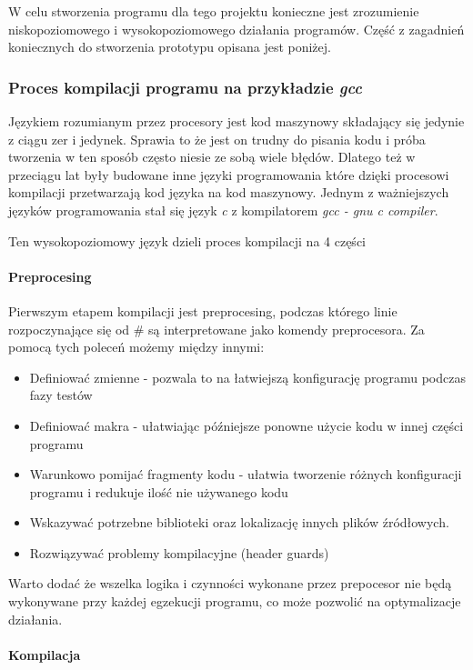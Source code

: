 \documentclass[a4paper,12pt]{article}
\begin{document}
W celu stworzenia programu dla tego projektu konieczne jest zrozumienie niskopoziomowego i wysokopoziomowego działania programów. Część z zagadnień koniecznych do stworzenia prototypu opisana jest poniżej. 

\subsubsection{Proces kompilacji programu na przykładzie \textit{gcc}}

Językiem rozumianym przez procesory jest kod maszynowy składający się jedynie z ciągu zer i jedynek.
Sprawia to że jest on trudny do pisania kodu i próba tworzenia w ten sposób często niesie ze sobą wiele błędów. 
Dlatego też w przeciągu lat były budowane inne języki programowania które dzięki procesowi kompilacji przetwarzają kod języka na kod maszynowy. 
Jednym z ważniejszych języków programowania stał się język \textit{c} z kompilatorem \textit{gcc - gnu c compiler}\cite{gcc}. 

Ten wysokopoziomowy język dzieli proces kompilacji na 4 części

\paragraph{Preprocesing}

Pierwszym etapem kompilacji jest preprocesing, podczas którego linie rozpoczynające się od \# są interpretowane jako komendy preprocesora.  
Za pomocą tych poleceń możemy między innymi:
\begin{itemize}
        \item Definiować zmienne - pozwala to na łatwiejszą konfigurację programu podczas fazy testów
        \item Definiować makra - ułatwiając późniejsze ponowne użycie kodu w innej części programu
        \item Warunkowo pomijać fragmenty kodu - ułatwia tworzenie różnych konfiguracji programu i redukuje ilość nie używanego kodu
        \item Wskazywać potrzebne biblioteki oraz lokalizację innych plików źródłowych.
        \item Rozwiązywać problemy kompilacyjne (header guards)
\end{itemize}
Warto dodać że wszelka logika i czynności wykonane przez prepocesor nie będą wykonywane przy każdej egzekucji programu, co może pozwolić na optymalizacje działania. 

\paragraph{Kompilacja}
\end{document}
